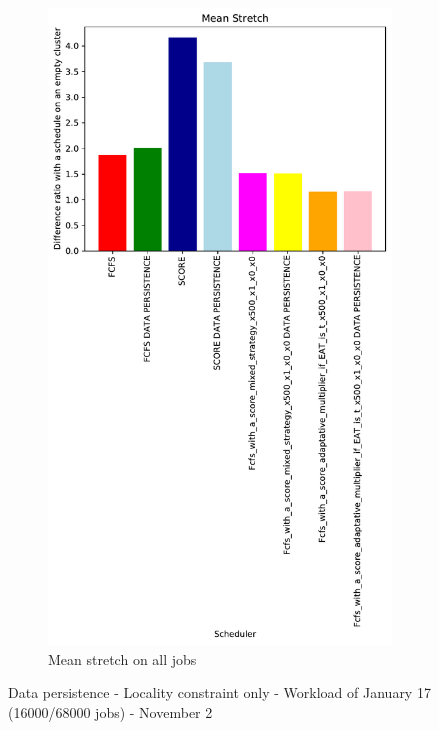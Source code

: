 \documentclass[a4paper]{article}
\begin{document}
\begin{figure}[H]
\begin{subfigure}[b]{0.4\linewidth}\centering\includegraphics[width=0.9\linewidth]{MBSS/plot/Results_Data_Persistence_2022-01-17->2022-01-17_V9271_Mean_Stretch_450_128_32_256_4_1024.pdf}\caption{Mean stretch on all jobs}\end{subfigure}
\caption{Data persistence - Locality constraint only - Workload of January 17 (16000/68000 jobs) - November 2}\end{figure}
\end{document}
